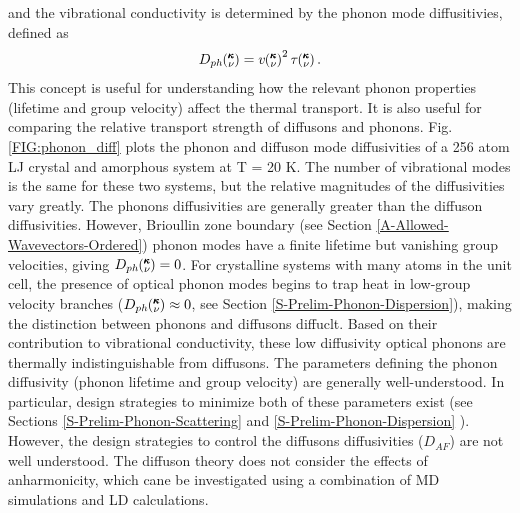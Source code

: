 \documentclass[letterpaper,12pt]{article}
\newcommand{\kv}{\mspace{-4.0mu}\left(\mspace{-8.0mu}\begin{smallmatrix}&\pmb{\kappa} \\&\nu\end{smallmatrix}\mspace{-3.0mu}\right)}
\begin{document}
and the vibrational conductivity is determined by the phonon mode diffusitivies, defined as
\begin{equation}\label{EQ:k_sum}
\begin{split}
D_{ph}\kv = v\kv^{2} \tau\kv.
\end{split}
\end{equation}
This concept is useful for understanding how the relevant phonon properties (lifetime and group velocity) affect the thermal transport. It is also useful for comparing the relative transport strength of diffusons and phonons. Fig. \ref{FIG:phonon_diff} plots the phonon and diffuson mode diffusivities of a 256 atom LJ crystal and amorphous system at T = 20 K. The number of vibrational modes is the same for these two systems, but the relative magnitudes of the diffusivities vary greatly. The phonons diffusivities are generally greater than the diffuson diffusivities. However, Brioullin zone boundary (see Section \ref{A-Allowed-Wavevectors-Ordered}) phonon modes have a finite lifetime but vanishing group velocities, giving $D_{ph}\kv = 0$.\cite{dove1993} For crystalline systems with many atoms in the unit cell, the presence of optical phonon modes begins to trap heat in low-group velocity branches ($D_{ph}\kv \approx 0$, see Section \ref{S-Prelim-Phonon-Dispersion}), making the distinction between phonons and diffusons diffuclt. Based on their contribution to vibrational conductivity, these low diffusivity optical phonons are thermally indistinguishable from diffusons.
The parameters defining the phonon diffusivity (phonon lifetime and group velocity) are generally well-understood. In particular, design strategies to minimize both of these parameters exist (see Sections \ref{S-Prelim-Phonon-Scattering} and \ref{S-Prelim-Phonon-Dispersion} ). However, the design strategies to control the diffusons diffusivities ($D_{AF}$) are not well understood.\cite{allen1993,shenogin2009} The diffuson theory does not consider the effects of anharmonicity, which cane be investigated using a combination of MD simulations and LD calculations.\cite{shenogin2009}
\end{document}
